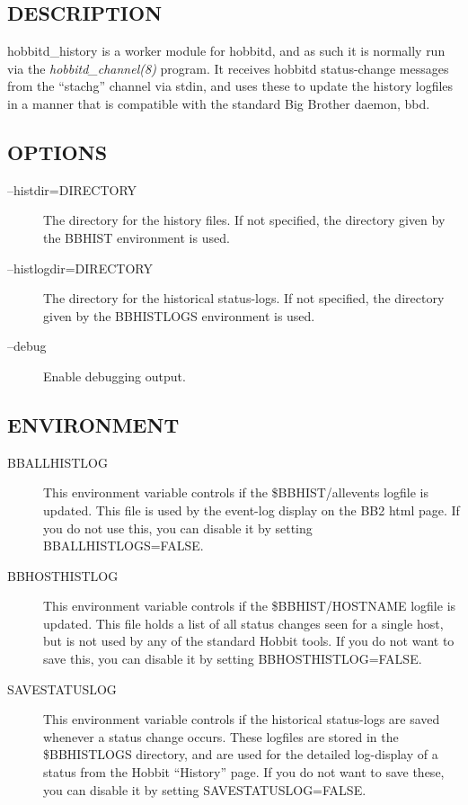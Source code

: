  
\subsection{DESCRIPTION}
 hobbitd\_history is a worker module for hobbitd, and as such it is
 normally run via the \emph{hobbitd\_channel(8)} program. It receives
 hobbitd status-change messages from the ``stachg'' channel via stdin,
 and uses these to update the history logfiles in a manner that is
 compatible with the standard Big Brother daemon, bbd. 


 
\subsection{OPTIONS}
\begin{description}
\item[--histdir=DIRECTORY] The directory for the history files. If not
  specified, the directory given by the BBHIST environment is used. 


 

\item[--histlogdir=DIRECTORY] The directory for the historical status-logs. If not specified, the directory given by the BBHISTLOGS environment is used. 

 

\item[--debug] Enable debugging output. 

 


\end{description}
\subsection{ENVIRONMENT}
\begin{description}
\item[BBALLHISTLOG] This environment variable controls if the
  \$BBHIST/allevents logfile is updated. This file is used by the
  event-log display on the BB2 html page. If you do not use this, you
  can disable it by setting BBALLHISTLOGS=FALSE. 


 

\item[BBHOSTHISTLOG] This environment variable controls if the
  \$BBHIST/HOSTNAME logfile is updated. This file holds a list of all
  status changes seen for a single host, but is not used by any of the
  standard Hobbit tools. If you do not want to save this, you can
  disable it by setting BBHOSTHISTLOG=FALSE. 


 

\item[SAVESTATUSLOG] This environment variable controls if the
  historical status-logs are saved whenever a status change
  occurs. These logfiles are stored in the \$BBHISTLOGS directory, and
  are used for the detailed log-display of a status from the Hobbit
  ``History'' page. If you do not want to save these, you can disable
  it by setting SAVESTATUSLOG=FALSE. 


 


\end{description}
